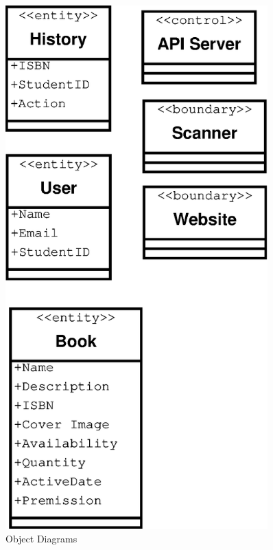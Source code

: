 \documentclass[a4paper, 10pt, oneside, draft]{article}
\begin{document}
\begin{figure}[p]
    \centering
    \includegraphics[width=0.9\textwidth]{Objects.eps}
    \caption{Object Diagrams}
    \label{fig:objects_image}
\end{figure}
\end{document}
